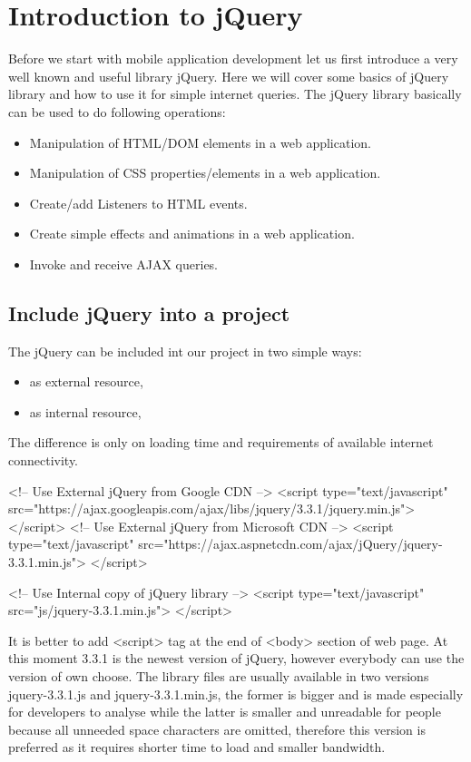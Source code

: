 \chapter{Introduction to jQuery }

Before we start with mobile application development let us first introduce a very well known and useful library jQuery. Here we will cover some basics of jQuery library and how to use it for simple internet queries. The jQuery library basically can be used to do following operations:
\begin{itemize}
\item Manipulation of HTML/DOM elements in a web application.
\item Manipulation of CSS properties/elements in a web application.
\item Create/add Listeners to HTML events.
\item Create simple effects and animations in a web application.
\item Invoke and receive AJAX queries.
\end{itemize}



\section{Include jQuery into a project}
The jQuery can be included int our project in two simple ways:
\begin{itemize}
\item as external resource,
\item as internal resource,
\end{itemize}

The difference is only on loading time and requirements of available internet connectivity.
\begin{html}
<!-- Use External jQuery from Google CDN -->
<script type="text/javascript"
    src="https://ajax.googleapis.com/ajax/libs/jquery/3.3.1/jquery.min.js">
</script>
<!-- Use External jQuery from Microsoft CDN -->
<script type="text/javascript"
    src="https://ajax.aspnetcdn.com/ajax/jQuery/jquery-3.3.1.min.js">
</script>

<!-- Use Internal copy of jQuery library -->
<script type="text/javascript"
    src="js/jquery-3.3.1.min.js">
</script>
\end{html}
It is better to add <script> tag at the  end of <body> section of web page. At this moment 3.3.1 is the newest version of jQuery, however everybody can use the version of own choose. The library files are usually available in two versions jquery-3.3.1.js and jquery-3.3.1.min.js, the former is bigger and is made especially for developers to analyse while the latter is smaller and unreadable for people because all unneeded space characters are omitted, therefore this version is preferred as it requires shorter time to load and smaller bandwidth.

